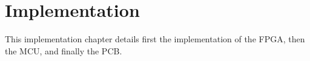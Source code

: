 \chapter{Implementation}
This implementation chapter details first the implementation of the FPGA, then
the MCU, and finally the PCB.
\clearpage



